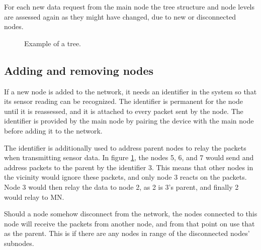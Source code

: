 For each new data request from the main node the tree structure and node levels are assessed again as they might have changed, due to new or disconnected nodes.

\begin{figure}[!h]
	\centering
	\caption{Example of a tree.}
	\label{fig:prottree1}
\end{figure}

\subsection*{Adding and removing nodes}
If a new node is added to the network, it needs an identifier in the system so that its sensor reading can be recognized. The identifier is permanent for the node until it is reassessed, and it is attached to every packet sent by the node.
The identifier is provided by the main node by pairing the device with the main node before adding it to the network. 

The identifier is additionally used to address parent nodes to relay the packets when transmitting sensor data. In figure \ref{fig:prottree1}, the nodes 5, 6, and 7 would send and address packets to the parent by the identifier 3. This means that other nodes in the vicinity would ignore these packets, and only node 3 reacts on the packets. Node 3 would then relay the data to node 2, as 2 is 3's parent, and finally 2 would relay to MN.

Should a node somehow disconnect from the network, the nodes connected to this node will receive the packets from another node, and from that point on use that as the parent. This is  if there are any nodes in range of the disconnected nodes' subnodes. 

